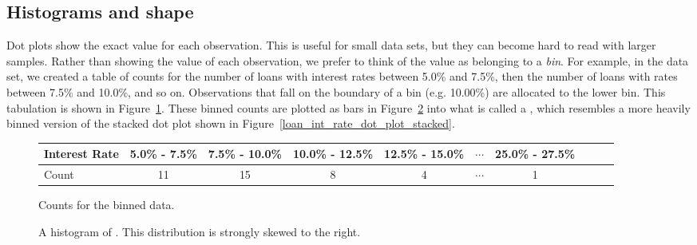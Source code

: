 


\subsection{Histograms and shape}
\label{histogramsAndShape}

Dot plots show the exact value for each observation.
This is useful for small data sets, but they can become
hard to read with larger samples. Rather than showing the
value of each observation, we prefer to think of the value
as belonging to a \emph{bin}.
For example, in the  data set, we created
a table of counts for the number of loans with interest
rates between 5.0\% and 7.5\%, then the number of loans
with rates between 7.5\% and 10.0\%, and so on.
Observations that fall on the boundary of a bin
(e.g. 10.00\%) are allocated to the lower bin.
This tabulation is shown in Figure~\ref{binnedIntRateAmountTable}.
These binned counts are plotted as bars in
Figure~\ref{loan50IntRateHist} into what is called
a , which resembles a more heavily binned
version of the stacked dot plot shown in
Figure~\ref{loan_int_rate_dot_plot_stacked}.

\begin{figure}[ht]
\centering\small
\begin{tabular}{l ccc ccc ccc}
  \hline
  Interest Rate &
      5.0\% - 7.5\% &
      7.5\% - 10.0\% &
      10.0\% - 12.5\% &
      12.5\% - 15.0\% &
      $\cdots$ &
      25.0\% - 27.5\% \\
  \hline
  Count & 11 & 15 & 8 & 4 & $\cdots$ & 1 \\
  \hline
\end{tabular}
\caption{Counts for the binned
     data.}
\label{binnedIntRateAmountTable}
\end{figure}

\begin{figure}[bth]
  \centering
  \caption{A histogram of .
      This distribution is strongly skewed to the right.
      }
  \label{loan50IntRateHist}
\end{figure}

